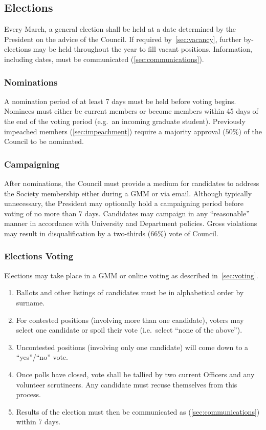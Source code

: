 \subsection{Elections}\label{sec:elections}
Every March, a general election shall be held at a date determined by the
President on the advice of the Council. If required by~\ref{sec:vacancy},
further by-elections may be held throughout the year to fill vacant positions.
Information, including dates, must be communicated (\ref{sec:communications}).

\subsubsection{Nominations}
A nomination period of at least 7 days must be held before voting begins.
Nominees must either be current members or become members within 45 days of the
end of the voting period (e.g.\ an incoming graduate student). Previously
impeached members (\ref{sec:impeachment}) require a majority approval ($50\%$)
of the Council to be nominated.

\subsubsection{Campaigning}
After nominations, the Council must provide a medium for candidates to address
the Society membership either during a GMM or via email. Although typically
unnecessary, the President may optionally hold a campaigning period before
voting of no more than 7 days. Candidates may campaign in any ``reasonable''
manner in accordance with University and Department policies. Gross violations
may result in disqualification by a two-thirds ($66\%$) vote of Council.

\subsubsection{Elections Voting}
Elections may take place in a GMM or online voting as described
in~\ref{sec:voting}.

\begin{enumerate}
      \item Ballots and other listings of candidates must be in alphabetical order by
            surname.
      \item For contested positions (involving more than one candidate), voters may select
            one candidate or spoil their vote (i.e.\ select ``none of the above'').
      \item Uncontested positions (involving only one candidate) will come down to a
            ``yes''/``no'' vote.
      \item Once polls have closed, vote shall be tallied by two current Officers and any
            volunteer scrutineers. Any candidate must recuse themselves from this process.
      \item Results of the election must then be communicated as (\ref{sec:communications})
            within 7 days.
\end{enumerate}

